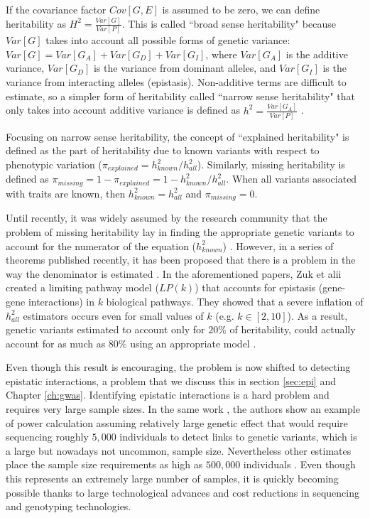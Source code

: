 If the covariance factor $Cov[G, E]$ is assumed to be zero, we can define heritability as $H^2 = \frac{Var[G] }{ Var[P]}$. 
This is called ``broad sense heritability" because $Var[G]$ takes into account all possible forms of genetic variance: $Var[G] = Var[G_A] + Var[G_D] + Var[G_I]$, where $Var[G_A]$ is the additive variance, $Var[G_D]$ is the variance from dominant alleles, and $Var[G_I]$ is the variance from interacting alleles (epistasis). 
Non-additive terms are difficult to estimate, so a simpler form of heritability called ``narrow sense heritability" that only takes into account additive variance is defined as $h^2 = \frac{ Var[G_A] }{ Var[P] }$ \cite{zuk2012mystery}.

Focusing on narrow sense heritability, the concept of ``explained heritability" is defined as the part of heritability due to known variants with respect to phenotypic variation ($\pi_{explained} = h^2_{known} / h^2_{all}$). 
Similarly, missing heritability is defined as $\pi_{missing} = 1 - \pi_{explained} = 1 - h^2_{known} / h^2_{all}$. 
When all variants associated with traits are known, then $h^2_{known} = h^2_{all}$ and $\pi_{missing} = 0$.

Until recently, it was widely assumed by the research community that the problem of missing heritability lay in finding the appropriate genetic variants to account for the numerator of the equation ($h^2_{known}$) \cite{zuk2012mystery}. 
However, in a series of theorems published recently, it has been proposed that there is a problem in the way the denominator is estimated \cite{zuk2012mystery}. 
In the aforementioned papers, Zuk et alii created a limiting pathway model ($LP(k)$) that accounts for epistasis (gene-gene interactions) in $k$ biological pathways. They showed that a severe inflation of $h^2_{all}$ estimators occurs even for small values of $k$ (e.g. $k \in [2,10]$). 
As a result, genetic variants estimated to account only for $20\%$ of heritability, could actually account for as much as $80\%$ using an appropriate model \cite{zuk2012mystery}.

Even though this result is encouraging, the problem is now shifted to detecting epistatic interactions, a problem that we discuss this in section \ref{sec:epi} and Chapter \ref{ch:gwas}.
Identifying epistatic interactions is a hard problem and requires very large sample sizes. 
In the same work \cite{zuk2012mystery}, the authors show an example of power calculation assuming relatively large genetic effect that would require sequencing roughly $5,000$ individuals to detect links to genetic variants, which is a large but nowadays not uncommon, sample size. 
Nevertheless other estimates place the sample size requirements as high as  $500,000$ individuals \cite{zuk2012mystery}. 
Even though this represents an extremely large number of samples, it is quickly becoming possible thanks to large technological advances and cost reductions in sequencing and genotyping technologies.

